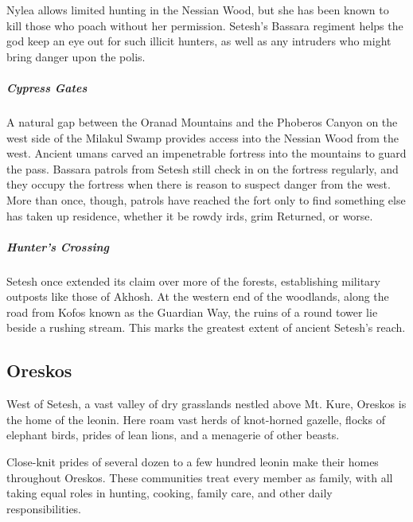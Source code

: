         Nylea allows limited hunting in the Nessian Wood, but she has been known to kill those who poach without her permission.
        Setesh's Bassara regiment helps the god keep an eye out for such illicit hunters, as well as any intruders who might bring danger upon the polis.

        \subparagraph{Cypress Gates} A natural gap between the Oranad Mountains and the Phoberos Canyon on the west side of the Milakul Swamp provides access into the Nessian Wood from the west.
        Ancient umans carved an impenetrable fortress into the mountains to guard the pass.
        Bassara patrols from Setesh still check in on the fortress regularly, and they occupy the fortress when there is reason to suspect danger from the west.
        More than once, though, patrols have reached the fort only to find something else has taken up residence, whether it be rowdy irds, grim Returned, or worse.

        \subparagraph{Hunter's Crossing} Setesh once extended its claim over more of the forests, establishing military outposts like those of Akhosh.
        At the western end of the woodlands, along the road from Kofos known as the Guardian Way, the ruins of a round tower lie beside a rushing stream.
        This marks the greatest extent of ancient Setesh's reach.

\subsection*{Oreskos}
    West of Setesh, a vast valley of dry grasslands nestled above Mt. Kure, Oreskos is the home of the leonin.
    Here roam vast herds of knot-horned gazelle, flocks of elephant birds, prides of lean lions, and a menagerie of other beasts.

    Close-knit prides of several dozen to a few hundred leonin make their homes throughout Oreskos.
    These communities treat every member as family, with all taking equal roles in hunting, cooking, family care, and other daily responsibilities.

